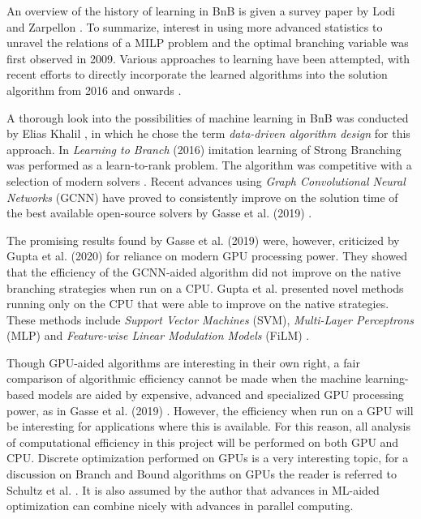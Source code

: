 An overview of the history of learning in \gls{BnB} is given a survey paper by Lodi and Zarpellon \cite{lodi2017learning}. To summarize, interest in using more advanced statistics to unravel the relations of a \gls{MILP} problem and the optimal branching variable was first observed in 2009. Various approaches to learning have been attempted, with recent efforts to directly incorporate the learned algorithms into the solution algorithm from 2016 and onwards \cite{lodi2017learning}.  

A thorough look into the possibilities of machine learning in \gls{BnB} was conducted by Elias Khalil \cite{khalil2020towards}, in which he chose the term \textit{data-driven algorithm design} for this approach. 
In \textit{Learning to Branch} (2016) \cite{khalil2016learning} imitation learning of Strong Branching was performed as a learn-to-rank problem. The algorithm was competitive with a selection of modern solvers \cite{khalil2016learning}. 
Recent advances using\textit{ Graph Convolutional Neural Networks} (\Gls{GCNN}) have proved to consistently improve on the solution time of the best available open-source solvers by Gasse et al. (2019) \cite{gasse2019exact}. 

The promising results found by Gasse et al. (2019) \cite{gasse2019exact} were, however, criticized by Gupta et al. (2020) \cite{gupta2020hybrid} for reliance on modern \gls{GPU} processing power. They showed that the efficiency of the \gls{GCNN}-aided algorithm did not improve on the native branching strategies when run on a \gls{CPU}. Gupta et al. presented novel methods running only on the \gls{CPU} that were able to improve on the native strategies. These methods include \textit{Support Vector Machines} (\Gls{SVM}), \textit{Multi-Layer Perceptrons} (\Gls{MLP}) and  \textit{Feature-wise Linear Modulation Models} (\gls{FiLM}) \cite{gupta2020hybrid}. 

Though \gls{GPU}-aided algorithms are interesting in their own right, a fair comparison of algorithmic efficiency cannot be made when the machine learning-based models are aided by expensive, advanced and specialized \gls{GPU} processing power, as in Gasse et al. (2019) \cite{gasse2019exact}. However, the efficiency when run on a \gls{GPU} will be interesting for applications where this is available. 
For this reason, all analysis of computational efficiency in this project will be performed on both \gls{GPU} and \gls{CPU}. Discrete optimization performed on \gls{GPU}s is a very interesting topic, for a discussion on Branch and Bound algorithms on \gls{GPU}s the reader is referred to Schultz et al. \cite{schulz2013gpu}. It is also assumed by the author that advances in ML-aided optimization can combine nicely with advances in parallel computing.


